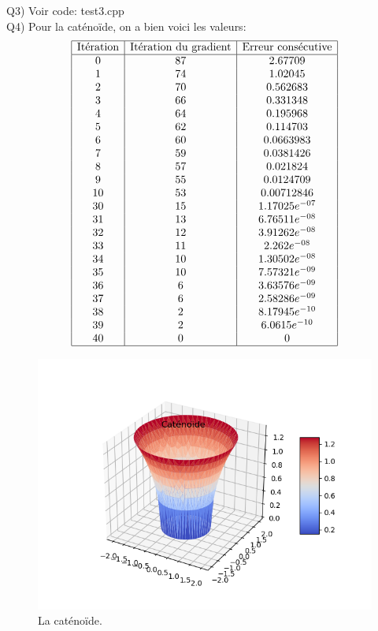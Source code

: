 \documentclass[a4paper, 11pt]{article}
\begin{document}
Q3) Voir code: test3.cpp \\

Q4) Pour la cat\'eno\"ide, on a bien voici les valeurs: \\

$$
\begin{array}{|c|c|c|}
\hline
\text{It\'eration} & \text{It\'eration du gradient} & \text{Erreur cons\'ecutive}
 \\
\hline
0 & 87 & 2.67709 \\
1 & 74 & 1.02045 \\
2 & 70 & 0.562683 \\
3 & 66 & 0.331348 \\
4 & 64 & 0.195968 \\
5 & 62 & 0.114703 \\
6 & 60 & 0.0663983 \\
7 & 59 & 0.0381426 \\
8 & 57 & 0.021824 \\
9 & 55 & 0.0124709 \\
10 & 53 & 0.00712846 \\
30 & 15 & 1.17025e^{-07} \\
31 & 13 & 6.76511e^{-08} \\
32 & 12 & 3.91262e^{-08} \\
33 & 11 & 2.262e^{-08} \\
34 & 10 & 1.30502e^{-08} \\
35 & 10 & 7.57321e^{-09} \\
36 & 6 & 3.63576e^{-09} \\
37 & 6 & 2.58286e^{-09} \\
38 & 2 & 8.17945e^{-10} \\
39 & 2 & 6.0615e^{-10} \\
40 & 0 & 0 \\
\hline
\end{array}
$$

\begin{figure}[h!]
  \centering
  \includegraphics[width=\linewidth]{catenoide.png}
  \caption{La cat\'eno\"ide.}
  \label{fig:catenoide}
\end{figure}
\end{document}
